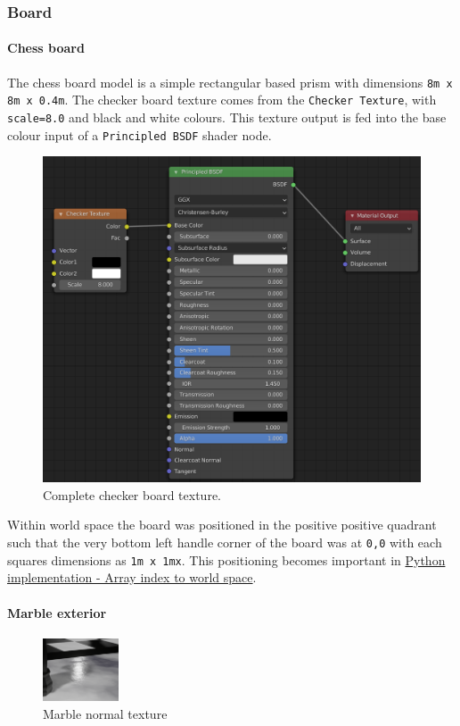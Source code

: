 \documentclass[11pt]{article}
\begin{document}
\subsubsection{Board}
\label{sec:orgd304f7f}
\paragraph{Chess board}
\label{sec:org0ee51fb}
The chess board model is a simple rectangular based prism with dimensions \texttt{8m x
8m x 0.4m}. The checker board texture comes from the \texttt{Checker Texture}, with
\texttt{scale=8.0} and black and white colours. This texture output is fed into
the base colour input of a \texttt{Principled BSDF} shader node.\\

\begin{figure}[htbp]
\centering
\includegraphics[width=350pt]{Images/checker texture.png}
\caption{\label{checker-texture}Complete checker board texture.}
\end{figure}

Within world space the board was positioned in the positive positive quadrant
such that the very bottom left handle corner of the board was at \texttt{0,0}
with each squares dimensions as \texttt{1m x 1mx}. This positioning becomes important
in \hyperref[sec:org3045217]{Python implementation - Array index to world space}.
\newpage
\paragraph{Marble exterior}
\label{sec:orgb9c464d}
\begin{figure}
\centering
\includegraphics[width=0.2\textwidth]{Images/normal.png}
\caption{\label{marble-normal-texture}Marble normal texture}
\end{figure}
\end{document}
